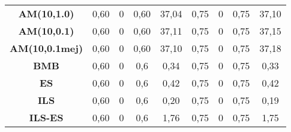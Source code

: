 \begin{table}[H]
{\begin{tabular}{ccccccccc}
\multicolumn{1}{|c|}{\textbf{AM(10,1.0)}} & 0,60 & 0 & 0,60 & \multicolumn{1}{c|}{37,04} & 0,75 & 0 & 0,75 & \multicolumn{1}{c|}{37,10} \\
\multicolumn{1}{|c|}{\textbf{AM(10,0.1)}} & 0,60 & 0 & 0,60 & \multicolumn{1}{c|}{37,11} & 0,75 & 0 & 0,75 & \multicolumn{1}{c|}{37,15} \\
\multicolumn{1}{|c|}{\textbf{AM(10,0.1mej)}} & 0,60 & 0 & 0,60 & \multicolumn{1}{c|}{37,10} & 0,75 & 0 & 0,75 & \multicolumn{1}{c|}{37,18} \\
\multicolumn{1}{|c|}{\textbf{BMB}} & 0,60 & 0 & 0,6 & \multicolumn{1}{c|}{0,34} & 0,75 & 0 & 0,75 & \multicolumn{1}{c|}{0,33} \\
\multicolumn{1}{|c|}{\textbf{ES}} & 0,60 & 0 & 0,6 & \multicolumn{1}{c|}{0,42} & 0,75 & 0 & 0,75 & \multicolumn{1}{c|}{0,42} \\
\multicolumn{1}{|c|}{\textbf{ILS}} & 0,60 & 0 & 0,6 & \multicolumn{1}{c|}{0,20} & 0,75 & 0 & 0,75 & \multicolumn{1}{c|}{0,19} \\
\multicolumn{1}{|c|}{\textbf{ILS-ES}} & 0,60 & 0 & 0,6 & \multicolumn{1}{c|}{1,76} & 0,75 & 0 & 0,75 & \multicolumn{1}{c|}{1,75} \\ \hline
\end{tabular}%
}
\end{table}

